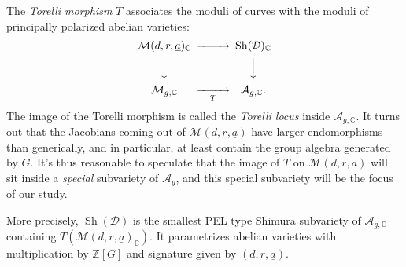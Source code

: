 \documentclass[reqno]{amsart} 
\begin{document}
The \emph{Torelli morphism} $T$ associates the moduli of curves with the moduli of principally polarized abelian varieties:
\begin{equation*}
  \begin{CD}         
    \mathcal{M}(d, r, \underline{a})_{\mathbb{C}}  @>>> \operatorname{Sh}(\mathcal{D})_{\mathbb{C}}\\
    @VVV  @VVV \\
    \mathcal{M}_{g, \mathbb{C}} @>>T> \mathcal{A}_{g, \mathbb{C}}.\\
  \end{CD}
\end{equation*}
The image of the Torelli morphism is called the \emph{Torelli locus} inside $\mathcal{A}_{g, \mathbb{C}}$.  It turns out that the Jacobians coming out of $\mathcal{M}(d, r, \underline{a})$ have larger endomorphisms than generically, and in particular, at least contain the group algebra generated by $G$.  It's thus reasonable to speculate that the image of $T$ on $\mathcal{M}(d, r, a)$ will sit inside a \emph{special} subvariety of $\mathcal{A}_g$, and this special subvariety will be the focus of our study.

More precisely, $\operatorname{Sh}(\mathcal{D})$ is the smallest PEL type Shimura subvariety of $\mathcal{A}_{g, \mathbb{C}}$ containing $T(\mathcal{M}(d, r, \underline{a})_{\mathbb{C}})$.  It parametrizes abelian varieties with multiplication by $\mathbb{Z}[G]$ and signature given by $(d, r, \underline{a})$.
\end{document}
